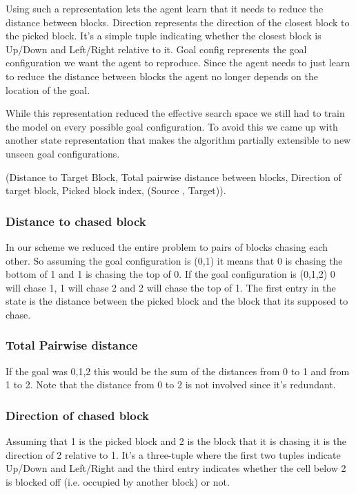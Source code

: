 \documentclass[letterpaper, 12 pt, conference]{ieeeconf}
\begin{document}
Using such a representation lets the agent learn that it needs to reduce the distance between blocks. Direction represents the direction of the closest block to the picked block. It’s a simple tuple indicating whether the closest block is Up/Down and Left/Right relative to it. Goal config represents the goal configuration we want the agent to reproduce. Since the agent needs to just learn to reduce the distance between blocks the agent no longer depends on the location of the goal.

While this representation reduced the effective search space we still had to train the model on every possible goal configuration. To avoid this we came up with another state representation that makes the algorithm partially extensible to new unseen goal configurations.

(Distance to Target Block, Total pairwise distance between blocks, Direction of target block, Picked block index, (Source , Target)).

\subsubsection{Distance to chased block} In our scheme we reduced the entire problem to pairs of blocks chasing each other. So assuming the goal configuration is (0,1) it means that 0 is chasing the bottom of 1 and 1 is chasing the top of 0. If the goal configuration is (0,1,2) 0 will chase 1, 1 will chase 2 and 2 will chase the top of 1.
The first entry in the state is the distance between the picked block and the block that its supposed to chase.

\subsubsection{Total Pairwise distance} If the goal was 0,1,2 this would be the sum of the distances from 0 to 1 and from 1 to 2. Note that the distance from 0 to 2 is not involved since it’s redundant.

\subsubsection{Direction of chased block} Assuming that 1 is the picked block and 2 is the block that it is chasing it is the direction of 2 relative to 1. It’s a three-tuple where the first two tuples indicate Up/Down and Left/Right and the third entry indicates whether the cell below 2 is blocked off (i.e. occupied by another block) or not. 
\end{document}
